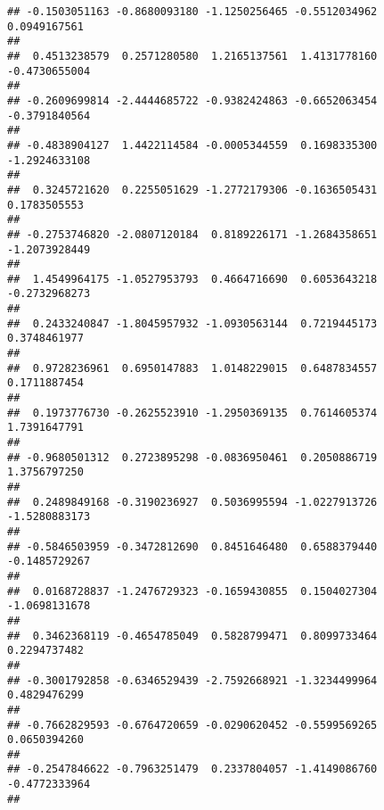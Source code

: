 \documentclass[]{article}
\begin{document}
\begin{verbatim}
## -0.1503051163 -0.8680093180 -1.1250256465 -0.5512034962  0.0949167561 
##                                                                       
##  0.4513238579  0.2571280580  1.2165137561  1.4131778160 -0.4730655004 
##                                                                       
## -0.2609699814 -2.4444685722 -0.9382424863 -0.6652063454 -0.3791840564 
##                                                                       
## -0.4838904127  1.4422114584 -0.0005344559  0.1698335300 -1.2924633108 
##                                                                       
##  0.3245721620  0.2255051629 -1.2772179306 -0.1636505431  0.1783505553 
##                                                                       
## -0.2753746820 -2.0807120184  0.8189226171 -1.2684358651 -1.2073928449 
##                                                                       
##  1.4549964175 -1.0527953793  0.4664716690  0.6053643218 -0.2732968273 
##                                                                       
##  0.2433240847 -1.8045957932 -1.0930563144  0.7219445173  0.3748461977 
##                                                                       
##  0.9728236961  0.6950147883  1.0148229015  0.6487834557  0.1711887454 
##                                                                       
##  0.1973776730 -0.2625523910 -1.2950369135  0.7614605374  1.7391647791 
##                                                                       
## -0.9680501312  0.2723895298 -0.0836950461  0.2050886719  1.3756797250 
##                                                                       
##  0.2489849168 -0.3190236927  0.5036995594 -1.0227913726 -1.5280883173 
##                                                                       
## -0.5846503959 -0.3472812690  0.8451646480  0.6588379440 -0.1485729267 
##                                                                       
##  0.0168728837 -1.2476729323 -0.1659430855  0.1504027304 -1.0698131678 
##                                                                       
##  0.3462368119 -0.4654785049  0.5828799471  0.8099733464  0.2294737482 
##                                                                       
## -0.3001792858 -0.6346529439 -2.7592668921 -1.3234499964  0.4829476299 
##                                                                       
## -0.7662829593 -0.6764720659 -0.0290620452 -0.5599569265  0.0650394260 
##                                                                       
## -0.2547846622 -0.7963251479  0.2337804057 -1.4149086760 -0.4772333964 
##                                                                       

\end{verbatim}
\end{document}
